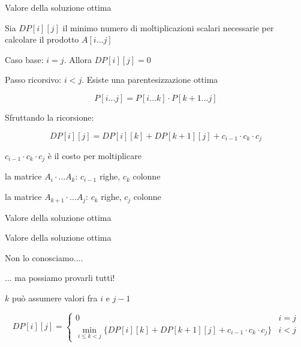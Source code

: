 \begin{frame}{Valore della soluzione ottima}

Sia \alert{$DP[i][j]$} il minimo numero di moltiplicazioni scalari necessarie per calcolare il prodotto $A[i \ldots j]$

\BIL
\item \alert{Caso base: $i=j$}. Allora $DP[i][j]=0$
\item \alert{Passo ricorsivo: $i < j$}. Esiste una parentesizzazione ottima 

\[
P[i \ldots j] = P[i \ldots k]  \cdot P[k+1 \ldots j]
\]

Sfruttando la ricorsione:

\[
DP[i][j] = DP[i][k] + DP[k+1][j] + c_{i-1} \cdot c_k \cdot c_j
\]

\item \alert{$c_{i-1} \cdot c_k \cdot c_j$} è il costo per moltiplicare
\BI
\item la matrice $A_i \cdot \ldots A_k$: $c_{i-1}$ righe, $c_k$ colonne
\item la matrice $A_{k+1} \cdot \ldots A_j$: $c_k$ righe, $c_j$ colonne
\EI
\EIL

\end{frame}

\begin{frame}{Valore della soluzione ottima}

\vspace{-9pt}

\end{frame}

\begin{frame}{Valore della soluzione ottima}

\vspace{-9pt}
\BIL
\item Non lo conosciamo....
\item ... ma possiamo provarli tutti!
\item $k$ può assumere valori fra $i$ e $j-1$
\EIL

\begin{myboxtitle}
\small
\[
  DP[i][j] = \begin{cases}
    0 & i=j \\
    \min_{i \leq k < j} \{ DP[i][k] + DP[k+1][j] + c_{i-1} \cdot c_k \cdot c_j \}  & i<j 
  \end{cases}
\]
\end{myboxtitle}

\end{frame}

